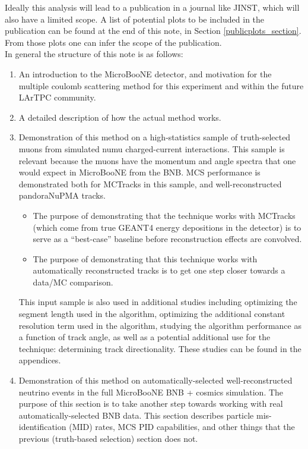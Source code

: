 \documentclass{article}
\begin{document}
Ideally this analysis will lead to a publication in a journal like JINST, which will also have a limited scope. A list of potential plots to be included in the publication can be found at the end of this note, in Section \ref{publicplots_section}. From those plots one can infer the scope of the publication.\\

In general the structure of this note is as follows:
\begin{enumerate}
\item An introduction to the MicroBooNE detector, and motivation for the multiple coulomb scattering method for this experiment and within the future LArTPC community.
\item A detailed description of how the actual method works.
\item Demonstration of this method on a high-statistics sample of truth-selected muons from simulated numu charged-current interactions. This sample is relevant because the muons have the momentum and angle spectra that one would expect in MicroBooNE from the BNB. MCS performance is demonstrated both for {\sc MCTracks} in this sample, and well-reconstructed pandoraNuPMA tracks. 
\begin{itemize}
	\item The purpose of demonstrating that the technique works with {\sc MCTracks} (which come from true {\sc GEANT4} energy depositions in the detector) is to serve as a ``best-case'' baseline before reconstruction effects are convolved. 
	\item The purpose of demonstrating that this technique works with automatically reconstructed tracks is to get one step closer towards a data/MC comparison.
\end{itemize}
This input sample is also used in additional studies including optimizing the segment length used in the algorithm, optimizing the additional constant resolution term used in the algorithm, studying the algorithm performance as a function of track angle, as well as a potential additional use for the technique: determining track directionality. These studies can be found in the appendices.
\item Demonstration of this method on automatically-selected well-reconstructed neutrino events in the full MicroBooNE BNB + cosmics simulation. The purpose of this section is to take another step towards working with real automatically-selected BNB data. This section describes particle mis-identification (MID) rates, MCS PID capabilities, and other things that the previous (truth-based selection) section does not.

\end{enumerate}
\end{document}
